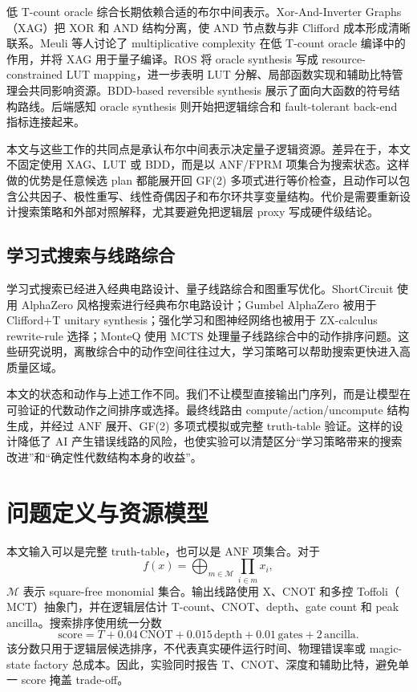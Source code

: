 \documentclass[UTF8,fontset=macnew,11pt]{ctexart}
\newcommand{\anf}{\ensuremath{\mathrm{ANF}}}
\newcommand{\fprm}{\ensuremath{\mathrm{FPRM}}}
\newcommand{\mcts}{\ensuremath{\mathrm{MCTS}}}
\newcommand{\mct}{\ensuremath{\mathrm{MCT}}}
\newcommand{\score}{\ensuremath{\mathrm{score}}}
\newcommand{\ttable}{truth-table}
\begin{document}
低 T-count oracle 综合长期依赖合适的布尔中间表示。Xor-And-Inverter Graphs（XAG）把 XOR 和 AND 结构分离，使 AND 节点数与非 Clifford 成本形成清晰联系。Meuli 等人讨论了 multiplicative complexity 在低 T-count oracle 编译中的作用\cite{meuli2019multiplicative}，并将 XAG 用于量子编译\cite{meuli2022xag}。ROS 将 oracle synthesis 写成 resource-constrained LUT mapping\cite{meuli2020ros}，进一步表明 LUT 分解、局部函数实现和辅助比特管理会共同影响资源。BDD-based reversible synthesis 展示了面向大函数的符号结构路线\cite{wille2009bdd}。后端感知 oracle synthesis 则开始把逻辑综合和 fault-tolerant back-end 指标连接起来\cite{yu2025backend}。

本文与这些工作的共同点是承认布尔中间表示决定量子逻辑资源。差异在于，本文不固定使用 XAG、LUT 或 BDD，而是以 \anf{}/\fprm{} 项集合为搜索状态。这样做的优势是任意候选 plan 都能展开回 GF(2) 多项式进行等价检查，且动作可以包含公共因子、极性重写、线性奇偶因子和布尔环共享变量结构。代价是需要重新设计搜索策略和外部对照解释，尤其要避免把逻辑层 proxy 写成硬件级结论。

\subsection{学习式搜索与线路综合}

学习式搜索已经进入经典电路设计、量子线路综合和图重写优化。ShortCircuit 使用 AlphaZero 风格搜索进行经典布尔电路设计\cite{tsaras2024shortcircuit}；Gumbel AlphaZero 被用于 Clifford+T unitary synthesis\cite{rietsch2024unitary}；强化学习和图神经网络也被用于 ZX-calculus rewrite-rule 选择\cite{riu2025rlzx}；MonteQ 使用 \mcts{} 处理量子线路综合中的动作排序问题\cite{machiya2026monteq}。这些研究说明，离散综合中的动作空间往往过大，学习策略可以帮助搜索更快进入高质量区域。

本文的状态和动作与上述工作不同。我们不让模型直接输出门序列，而是让模型在可验证的代数动作之间排序或选择。最终线路由 compute/action/uncompute 结构生成，并经过 \anf{} 展开、GF(2) 多项式模拟或完整 \ttable{} 验证。这样的设计降低了 AI 产生错误线路的风险，也使实验可以清楚区分“学习策略带来的搜索改进”和“确定性代数结构本身的收益”。

\section{问题定义与资源模型}

本文输入可以是完整 \ttable{}，也可以是 \anf{} 项集合。对于
\begin{equation}
  f(x)=\bigoplus_{m\in\mathcal{M}}\prod_{i\in m}x_i ,
  \label{eq:anf}
\end{equation}
$\mathcal{M}$ 表示 square-free monomial 集合。输出线路使用 X、CNOT 和多控 Toffoli（\mct{}）抽象门，并在逻辑层估计 T-count、CNOT、depth、gate count 和 peak ancilla。搜索排序使用统一分数
\begin{equation}
  \score = T + 0.04\,\mathrm{CNOT} + 0.015\,\mathrm{depth}
         + 0.01\,\mathrm{gates} + 2\,\mathrm{ancilla}.
  \label{eq:score}
\end{equation}
该分数只用于逻辑层候选排序，不代表真实硬件运行时间、物理错误率或 magic-state factory 总成本。因此，实验同时报告 T、CNOT、深度和辅助比特，避免单一 score 掩盖 trade-off。
\end{document}

